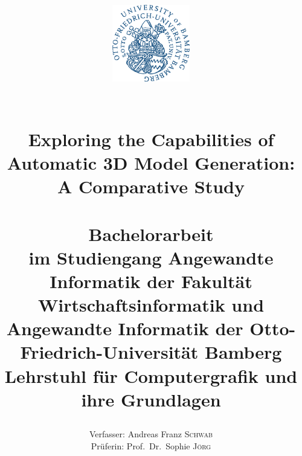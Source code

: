 \title{ 
    \vspace{-4cm}
    \begin{figure}[h]
    \centering
    \includegraphics[width=0.3\textwidth]{figures/ub_logo.png}
    \end{figure}
    \vspace{1cm}
	\HRule{2pt}\\
	\LARGE \textbf{Exploring the Capabilities of Automatic 3D Model Generation: A Comparative Study}\\
	\HRule{2pt}\\
	\vspace{2cm}
	\normalsize Bachelorarbeit\\
	\vspace{0.5cm}
	im Studiengang Angewandte Informatik der Fakultät Wirtschaftsinformatik und Angewandte Informatik der Otto-Friedrich-Universität Bamberg\\
	\vspace{0.5cm}
	Lehrstuhl für Computergrafik und ihre Grundlagen\\
	\vspace{4cm} %
}

\date{}

\author{
    \begin{minipage}{\textwidth}
    \begin{flushleft}
    Verfasser: Andreas Franz \textsc{Schwab}\\
    \vspace{0.5cm}
    Prüferin: Prof.\ Dr.\ Sophie \textsc{Jörg}
    \end{flushleft}
    \end{minipage}
}

\maketitle